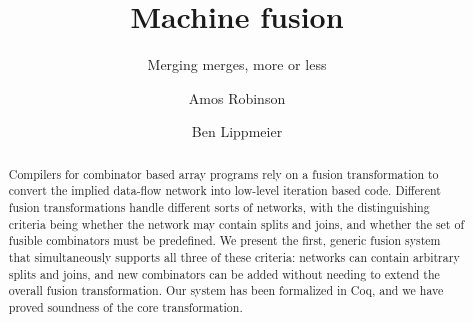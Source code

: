 \documentclass[acmlarge,review,anonymous]{acmart}\settopmatter{printfolios=true}
\begin{document}
\title{Machine fusion}
\subtitle{Merging merges, more or less}

\author{Amos Robinson}

\author{Ben Lippmeier}

\makeatactive
\begin{abstract}
Compilers for combinator based array programs rely on a fusion transformation to convert the implied data-flow network into low-level iteration based code. Different fusion transformations handle different sorts of networks, with the distinguishing criteria being whether the network may contain splits and joins, and whether the set of fusible combinators must be predefined. We present the first, generic fusion system that simultaneously supports all three of these criteria: networks can contain arbitrary splits and joins, and new combinators can be added without needing to extend the overall fusion transformation. Our system has been formalized in Coq, and we have proved soundness of the core transformation.
\end{abstract}


\maketitle













\end{document}
